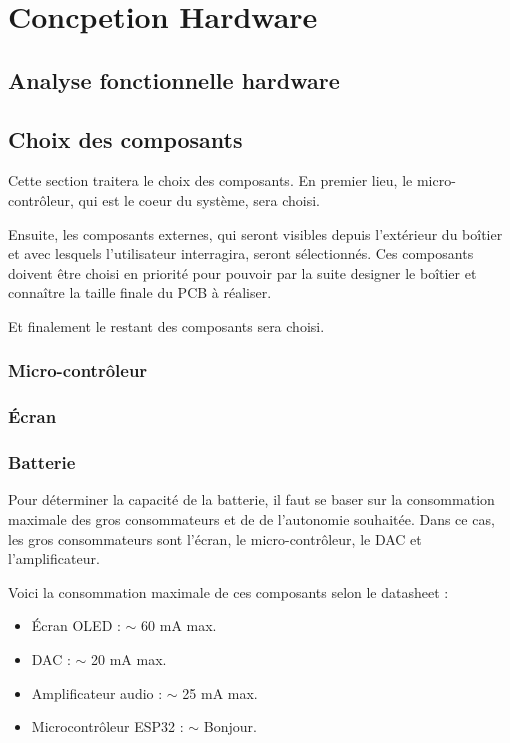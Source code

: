 \chapter{Concpetion Hardware}

\section{Analyse fonctionnelle hardware}



\clearpage
\section{Choix des composants}
Cette section traitera le choix des composants. En premier lieu, le micro-contrôleur, qui est le coeur du système, sera choisi.

Ensuite, les composants externes, qui seront visibles depuis l'extérieur du boîtier et avec lesquels l'utilisateur interragira, seront sélectionnés.
Ces composants doivent être choisi en priorité pour pouvoir par la suite designer le boîtier et connaître la taille finale du PCB à réaliser.

Et finalement le restant des composants sera choisi.

\subsection{Micro-contrôleur}

\subsection{Écran}

\subsection{Batterie}
Pour déterminer la capacité de la batterie, il faut se baser sur la consommation maximale des gros consommateurs et de de l'autonomie souhaitée. Dans ce cas, les gros consommateurs sont l'écran, le micro-contrôleur, le DAC et l'amplificateur.

Voici la consommation maximale de ces composants selon le datasheet :

\begin{itemize}
    \item Écran OLED : $\sim$ 60 mA max.
    \item DAC : $\sim$ 20 mA max.
    \item Amplificateur audio : $\sim$ 25 mA max.
    \item Microcontrôleur ESP32 : $\sim$ Bonjour.
\end{itemize}

